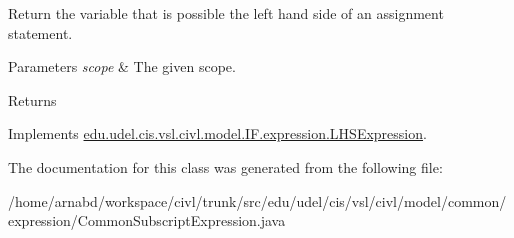 Return the variable that is possible the left hand side of an assignment statement. 


\begin{DoxyParams}{Parameters}
{\em scope} & The given scope. \\
\hline
\end{DoxyParams}
\begin{DoxyReturn}{Returns}

\end{DoxyReturn}


Implements \hyperlink{interfaceedu_1_1udel_1_1cis_1_1vsl_1_1civl_1_1model_1_1IF_1_1expression_1_1LHSExpression_a78e628bb1248aa61856dcf4a921aff52}{edu.\+udel.\+cis.\+vsl.\+civl.\+model.\+I\+F.\+expression.\+L\+H\+S\+Expression}.



The documentation for this class was generated from the following file\+:\begin{DoxyCompactItemize}
\item 
/home/arnabd/workspace/civl/trunk/src/edu/udel/cis/vsl/civl/model/common/expression/Common\+Subscript\+Expression.\+java\end{DoxyCompactItemize}
